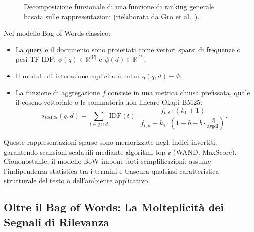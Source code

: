\begin{figure}[H]
\caption{Decomposizione funzionale di una funzione di ranking generale basata sulle rappresentazioni (rielaborata da Guo et al.~\cite{guo2020}).}
\label{fig:ltr-general-ranking-framework}
\end{figure}

Nel modello Bag of Words classico:
\begin{itemize}
    \item La query e il documento sono proiettati come vettori sparsi di frequenze o pesi TF-IDF: $\phi(q) \in \mathbb{R}^{|\mathcal{V}|}$ e $\psi(d) \in \mathbb{R}^{|\mathcal{V}|}$;
    \item Il modulo di interazione esplicita \`e nullo: $\eta(q, d) = \emptyset$;
    \item La funzione di aggregazione $f$ consiste in una metrica chiusa prefissata, quale il coseno vettoriale o la sommatoria non lineare Okapi BM25:
    \begin{equation}
        s_{\text{BM25}}(q, d) = \sum_{t \in q \cap d} \text{IDF}(t) \cdot \frac{f_{t,d} \cdot (k_1 + 1)}{f_{t,d} + k_1 \cdot \left(1 - b + b \cdot \frac{|d|}{\text{avgdl}}\right)}.
    \end{equation}
\end{itemize}

Queste rappresentazioni sparse sono memorizzate negli indici invertiti, garantendo scansioni scalabili mediante algoritmi top-$k$ (WAND, MaxScore). Ciononostante, il modello BoW impone forti semplificazioni: assume l'indipendenza statistica tra i termini e trascura qualsiasi caratteristica strutturale del testo o dell'ambiente applicativo.

\FloatBarrier
\subsection{Oltre il Bag of Words: La Molteplicit\`a dei Segnali di Rilevanza}
\label{subsec:segnali-oltre-bow}


